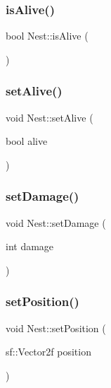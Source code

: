 \subsubsection{\texorpdfstring{is\+Alive()}{isAlive()}}
{\footnotesize\ttfamily bool Nest\+::is\+Alive (\begin{DoxyParamCaption}{ }\end{DoxyParamCaption})}

\mbox{\label{class_nest_a122840333f4f0d0f5acd2815b0f633ca}} 
\subsubsection{\texorpdfstring{set\+Alive()}{setAlive()}}
{\footnotesize\ttfamily void Nest\+::set\+Alive (\begin{DoxyParamCaption}\item[{bool}]{alive }\end{DoxyParamCaption})}

\mbox{\label{class_nest_a2a5904049fbb094af9f79ec55a5be9d6}} 
\subsubsection{\texorpdfstring{set\+Damage()}{setDamage()}}
{\footnotesize\ttfamily void Nest\+::set\+Damage (\begin{DoxyParamCaption}\item[{int}]{damage }\end{DoxyParamCaption})}

\mbox{\label{class_nest_a483c559f957838c28d613fddad8b99f3}} 
\subsubsection{\texorpdfstring{set\+Position()}{setPosition()}}
{\footnotesize\ttfamily void Nest\+::set\+Position (\begin{DoxyParamCaption}\item[{sf\+::\+Vector2f}]{position }\end{DoxyParamCaption})}

\mbox{\label{class_nest_a90efe6e30a891f7dd0620d4f14c3cef6}} 
